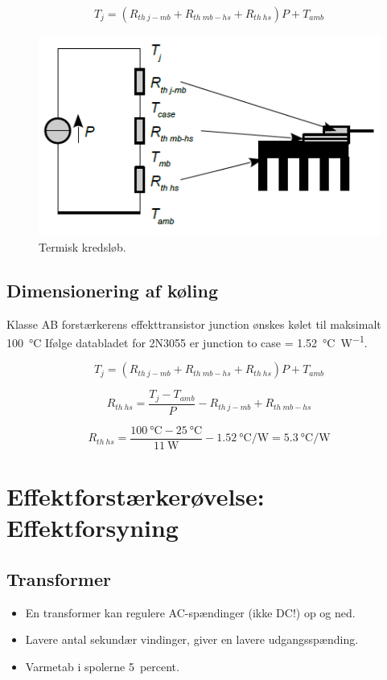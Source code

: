 \documentclass[danish]{article}
\begin{document}
\begin{equation}
T_j = (R_{th\:j-mb} + R_{th\: mb-hs} + R_{th\: hs})P + T_{amb}
\end{equation}

\begin{figure} [H]
	\centering
	\includegraphics[width=0.5\linewidth]{graphics/termiskdesign}
	\caption{Termisk kredsløb.}
	\label{fig:termiskdesign}
\end{figure}

\subsection{Dimensionering af køling}
Klasse AB forstærkerens effekttransistor junction ønskes kølet til maksimalt \SI{100}{\degreeCelsius}
Ifølge databladet for 2N3055 er junction to case = \SI{1.52}{\degreeCelsius\per\watt}.

\begin{equation}
T_j = (R_{th\:j-mb} + R_{th\: mb-hs} + R_{th\: hs})P + T_{amb}
\end{equation}

\begin{equation}
R_{th\: hs} = \dfrac{T_j-T_{amb}}{P}-R_{th\:j-mb} + R_{th\: mb-hs}
\end{equation}

\begin{equation}
R_{th\: hs} = \dfrac{\SI{100}{\degreeCelsius}-\SI{25}{\degreeCelsius}}{\SI{11}{\watt}}-\SI{1.52}{\degreeCelsius\per\watt} = \SI{5.3}{\degreeCelsius\per\watt}
\end{equation}




\newpage
\section{Effektforstærkerøvelse: Effektforsyning}

\subsection{Transformer}
\begin{itemize}
	\item En transformer kan regulere AC-spændinger (ikke DC!) op og ned.
	\item Lavere antal sekundær vindinger, giver en lavere udgangsspænding.
	\item Varmetab i spolerne \approx \SI{5}{percent}.
\end{itemize}
\end{document}
